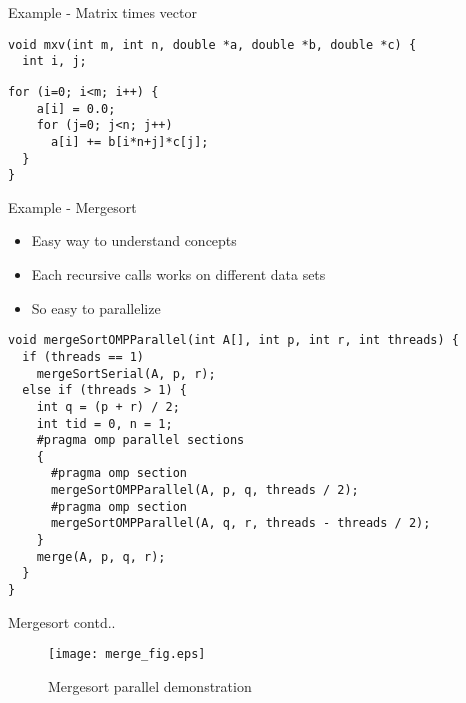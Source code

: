 \documentclass[10pt]{beamer}
\begin{document}
\begin{frame}[fragile]{Example - Matrix times vector}
\begin{Verbatim}[fontsize=\small, formatcom=\color{red}]
void mxv(int m, int n, double *a, double *b, double *c) {
  int i, j;
\end{Verbatim}
\begin{Verbatim}[fontsize=\small, formatcom=\color{red}]
  for (i=0; i<m; i++) {
    a[i] = 0.0;
    for (j=0; j<n; j++)
      a[i] += b[i*n+j]*c[j];
  }
}
\end{Verbatim}
\end{frame}

\begin{frame}[fragile]{Example - Mergesort}
\begin{itemize}
\item Easy way to understand concepts
\item Each recursive calls works on different data sets
\item So easy to parallelize
\end{itemize}
\begin{Verbatim}[frame=single, fontsize=\small, formatcom=\color{red}]
void mergeSortOMPParallel(int A[], int p, int r, int threads) {
  if (threads == 1)
    mergeSortSerial(A, p, r);
  else if (threads > 1) {
    int q = (p + r) / 2;
    int tid = 0, n = 1;
    #pragma omp parallel sections
    {
      #pragma omp section
      mergeSortOMPParallel(A, p, q, threads / 2);
      #pragma omp section
      mergeSortOMPParallel(A, q, r, threads - threads / 2);
    }
    merge(A, p, q, r);
  }
}
\end{Verbatim}
\end{frame}

\begin{frame}{Mergesort contd..}
\begin{figure}
\begin{center}
\texttt{[image: merge\_fig.eps]}
\caption{Mergesort parallel demonstration}
\end{center}
\end{figure}
\end{frame}
\end{document}

